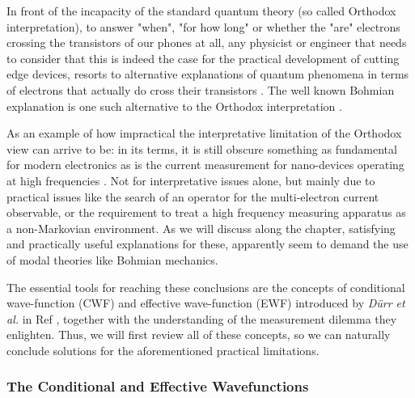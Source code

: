 \documentclass[11pt, a4paper]{article} %
\begin{document}
\newpage
{}
\setcounter{page}{1}

\hspace*{4mm} In front of the incapacity of the standard quantum theory (so called Orthodox interpretation), to answer "when", "for how long" or whether the "are" electrons crossing the transistors of our phones at all, any physicist or engineer that needs to consider that this is indeed the case for the practical development of cutting edge devices, resorts to alternative explanations of quantum phenomena in terms of electrons that actually do cross their transistors \cite{where}. The well known Bohmian explanation is one such alternative to the Orthodox interpretation \cite{Bohm,Holland, Durr,JordiXavier}. 

As an example of how impractical the interpretative limitation of the Orthodox view can arrive to be: in its terms, it is still obscure something as fundamental for modern electronics as is the current measurement for nano-devices operating at high frequencies \cite{Thz}. Not for interpretative issues alone, but mainly due to practical issues like the search of an operator for the multi-electron current observable, or the requirement to treat a high frequency measuring apparatus as a non-Markovian environment. As we will discuss along the chapter, satisfying and practically useful explanations for these, apparently seem to demand the use of modal theories like Bohmian mechanics. 

The essential tools for reaching these conclusions are the concepts of conditional wave-function (CWF) and effective wave-function (EWF) introduced by {\em Dürr et al.} in Ref \cite{Absolute}, together with the understanding of the measurement dilemma they enlighten. Thus, we will first review all of these concepts, so we can naturally conclude solutions for the aforementioned practical limitations.
\vspace{-0.2cm}

\subsubsection*{The Conditional and Effective Wavefunctions}
\vspace{-0.2cm}
\end{document}
